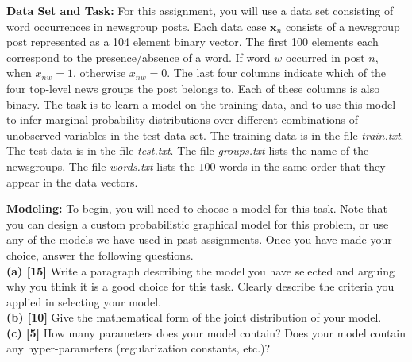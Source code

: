 \documentclass[11pt]{article}
\newcommand{\mbf}[1]{{\mathbf{#1}}}
\begin{document}
\textbf{Data Set and Task:} For this assignment, you will use a data set consisting of word occurrences in newsgroup posts. Each data case $\mbf{x}_n$ consists of a newsgroup post represented as a 104 element binary vector. The first 100 elements each correspond to the presence/absence of a word. If word $w$ occurred in post $n$, when $x_{nw}=1$, otherwise $x_{nw}=0$. 
The last four columns indicate which of the four top-level news groups the post belongs to. Each of these columns is also binary. The task is to learn a model on the training data, and to use this model to infer marginal probability distributions over different combinations of unobserved variables in the test data set. The training data is in the file \textit{train.txt}. The test data is in the file \textit{test.txt}. The file \textit{groups.txt} lists the name of the newsgroups. The file \textit{words.txt} lists the $100$ words in the same order that they appear in the data vectors. 

\begin{problem}{30} \textbf{Modeling:} To begin, you will need to choose a model for this task. Note that you can design a custom probabilistic graphical model for this problem, or use any of the models we have used in past assignments. Once you have made your choice, answer the following questions.\\

\textbf{(a) [15]} Write a paragraph describing the model you have selected and arguing why you think it is a good choice for this task. Clearly describe the criteria you applied in selecting your model.\\

\textbf{(b) [10]} Give the mathematical form of the joint distribution of your model.\\

\textbf{(c) [5]} How many parameters does your model contain? Does your model contain any hyper-parameters (regularization constants, etc.)?

\end{problem}
\end{document}
